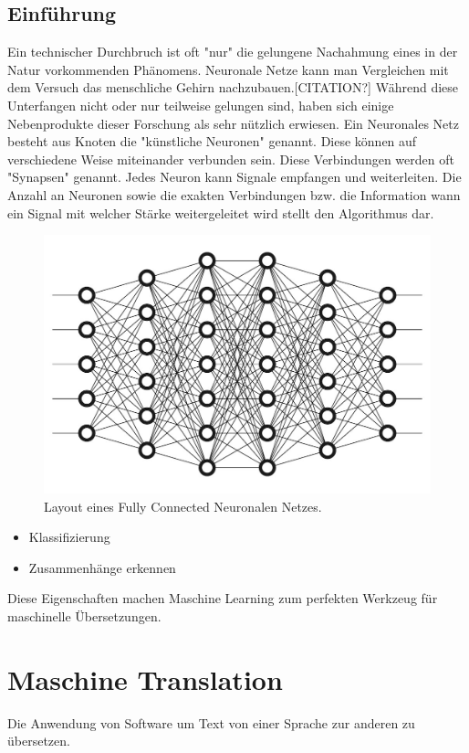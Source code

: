 \documentclass{thesisclass}
\begin{document}
	\subsection{Einführung}
		Ein technischer Durchbruch ist oft "nur" die gelungene Nachahmung eines in der Natur vorkommenden Phänomens. Neuronale Netze kann man Vergleichen mit dem Versuch das menschliche Gehirn nachzubauen.[CITATION?] Während diese Unterfangen nicht oder nur teilweise gelungen sind, haben sich einige Nebenprodukte dieser Forschung als sehr nützlich erwiesen.
Ein Neuronales Netz besteht aus Knoten die "künstliche Neuronen" genannt. Diese können auf verschiedene Weise miteinander verbunden sein. Diese Verbindungen werden oft "Synapsen" genannt. Jedes Neuron kann Signale empfangen und weiterleiten. Die Anzahl an Neuronen sowie die exakten Verbindungen bzw. die Information wann ein Signal mit welcher Stärke weitergeleitet wird stellt den Algorithmus dar.
\begin{figure}[h]
  		\includegraphics[width=\linewidth]{images/DeepNeuralNetwork.jpg}
  		\caption{Layout eines Fully Connected Neuronalen Netzes. 	\cite{NeuronalesNetzImage} }
  		\label{fig:Neuronales Netz}
\end{figure}
\begin{itemize}
	\item Klassifizierung
	\item Zusammenhänge erkennen
\end{itemize}
Diese Eigenschaften machen Maschine Learning zum perfekten Werkzeug für maschinelle Übersetzungen.
\section{Maschine Translation}
Die Anwendung von Software um Text von einer Sprache zur anderen zu übersetzen.
\end{document}

